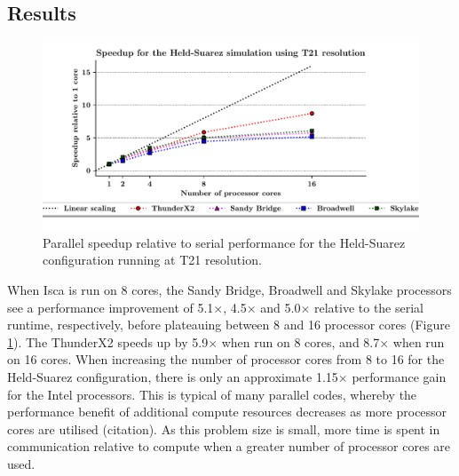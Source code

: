 \documentclass[a4paper,11pt]{report}
\begin{document}
\subsection{Results}
\begin{figure}[htbp]
\begin{center}
\includegraphics[width=1\textwidth]{img/speedup-T21-Held_suarez.pdf}
\caption[Parallel speedup relative to serial performance for the Held-Suarez configuration running at T21 resolution]{Parallel speedup relative to serial performance for the Held-Suarez configuration running at T21 resolution.}
\label{fig:t21-scale}
\end{center}
\end{figure}
\par
When Isca is run on 8 cores, the Sandy Bridge, Broadwell and Skylake processors see a performance improvement of  5.1$\times$, 4.5$\times$ and 5.0$\times$ relative to the serial runtime, respectively, before plateauing between 8 and 16 processor cores (Figure \ref{fig:t21-scale}). The ThunderX2 speeds up by 5.9$\times$ when run on 8 cores, and 8.7$\times$ when run on 16 cores. When increasing the number of processor cores from 8 to 16 for the Held-Suarez configuration, there is only an approximate 1.15$\times$ performance gain for the Intel processors. This is typical of many parallel codes, whereby the performance benefit of additional compute resources decreases as more processor cores are utilised (citation). As this problem size is small, more time is spent in communication relative to compute when a greater number of processor cores are used. 
\par
\end{document}
